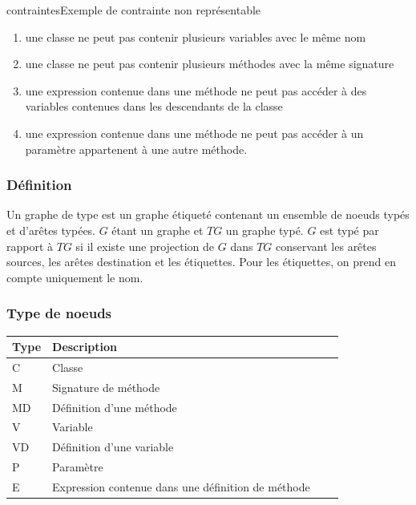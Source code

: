 \documentclass[a4paper, 12pt]{article}
\begin{document}
  \begin{myfig}{contraintes}{Exemple de contrainte non représentable}
    \begin{enumerate}
      \item \scriptsize une classe ne peut pas contenir plusieurs variables avec le même nom
      \item \scriptsize une classe ne peut pas contenir plusieurs méthodes avec la même signature
      \item \scriptsize une expression contenue dans une méthode ne peut pas accéder à des variables contenues dans les descendants de la classe
      \item \scriptsize une expression contenue dans une méthode ne peut pas accéder à un paramètre appartenent à une autre méthode.
    \end{enumerate}
  \end{myfig}

  \subsubsection{Définition}
  Un graphe de type est un graphe étiqueté contenant un ensemble de noeuds typés et d'arêtes typées. \(G\) étant un graphe et \(TG\) un graphe typé. \(G\) est typé par rapport à \(TG\) si il existe une projection
  de \(G\) dans \(TG\) conservant les arêtes sources, les arêtes destination et les étiquettes. Pour les étiquettes, on prend en compte uniquement le nom.

  \subsubsection{Type de noeuds}

  \begin{tabular}{ | l | l | l | p{5cm} |}
    \hline
    Type & Description  \\ \hline
    C & Classe   \\ \hline
    M & Signature de méthode   \\ \hline
    MD &  Définition d'une méthode   \\ \hline
    V &  Variable   \\ \hline
    VD &  Définition d'une variable \\ \hline
    P & Paramètre \\ \hline
    E &  Expression contenue dans une définition de méthode \\ \hline
  \end{tabular}
\end{document}
